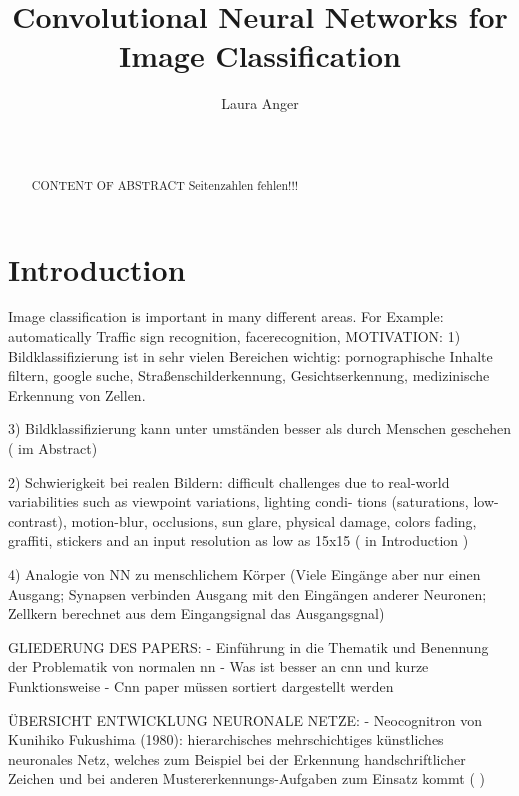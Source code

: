 \documentclass{sig-alternate-05-2015}
\begin{document}
\title{Convolutional Neural Networks for Image Classification}

\author{
\alignauthor
Laura Anger\\
       \\
       \\
}
      
\maketitle
\begin{abstract}
CONTENT OF ABSTRACT
Seitenzahlen fehlen!!!
\end{abstract}


\section{Introduction}

Image classification is important in many different areas. For Example: automatically Traffic sign recognition, facerecognition, 
MOTIVATION: 
1) Bildklassifizierung ist in sehr vielen Bereichen wichtig: pornographische Inhalte filtern, google suche, Straßenschilderkennung, Gesichtserkennung, medizinische Erkennung von Zellen. 

3) Bildklassifizierung kann unter umständen besser als durch Menschen geschehen (\cite{6033458} im Abstract)

2) Schwierigkeit bei realen Bildern: difficult challenges due to real-world variabilities such as viewpoint variations, lighting condi- tions (saturations, low-contrast), motion-blur, occlusions, sun glare, physical damage, colors fading, graffiti, stickers and an input resolution as low as 15x15 (\cite{6033589} in Introduction )

4) Analogie von NN zu menschlichem Körper (Viele Eingänge aber nur einen Ausgang; Synapsen verbinden Ausgang mit den Eingängen anderer Neuronen; Zellkern berechnet aus dem Eingangsignal das Ausgangsgnal)

GLIEDERUNG DES PAPERS:
- Einführung in die Thematik und Benennung der Problematik von normalen nn
- Was ist besser an cnn und kurze Funktionsweise
- Cnn paper müssen sortiert dargestellt werden


ÜBERSICHT ENTWICKLUNG NEURONALE NETZE: 
- Neocognitron von Kunihiko Fukushima (1980): hierarchisches mehrschichtiges künstliches neuronales Netz, welches zum Beispiel bei der Erkennung handschriftlicher Zeichen und bei anderen Mustererkennungs-Aufgaben zum Einsatz kommt ( \cite{Fukushima1980} )
\end{document}
